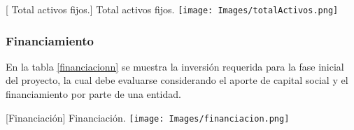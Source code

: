 \vspace{2mm}
\begin{minipage}{0.9\textwidth}
\centering
{}[{ Total activos fijos.}]{ Total activos fijos. }
\label{totalActivos}
\texttt{[image: Images/totalActivos.png]}
\end{minipage}

\subsubsection{Financiamiento}
En la tabla \ref{financiacionn} se muestra la inversión requerida para la fase inicial del proyecto, la cual debe evaluarse considerando el aporte de capital social y el financiamiento por parte de una entidad.

\vspace{2mm}
\begin{minipage}{0.9\textwidth}
\centering
{}[{Financiación}]{ Financiación. }
\label{financiacionn}
\texttt{[image: Images/financiacion.png]}
\end{minipage}